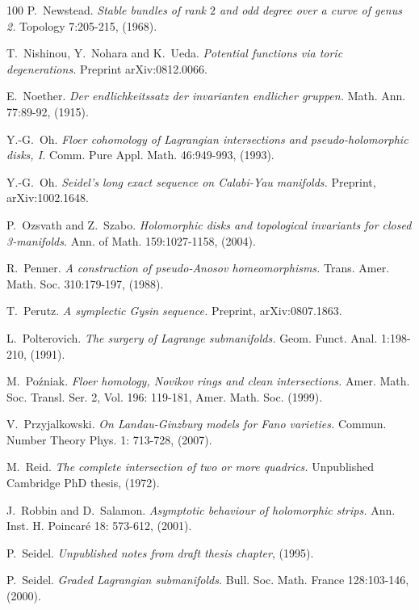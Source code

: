\documentclass[reqno,10pt]{amsart}
\numberwithin{equation}{section}
\theoremstyle{remark}
\begin{document}
\begin{thebibliography}{100}
P.~Newstead.
\emph{Stable bundles of rank $2$ and odd degree over a curve of genus 2.}
Topology 7:205-215, (1968).

T.~Nishinou, Y.~Nohara and  K.~Ueda.
\emph{Potential functions via toric degenerations.}
Preprint arXiv:0812.0066.

E.~Noether.
\emph{Der endlichkeitssatz der invarianten endlicher gruppen.}
Math. Ann. 77:89-92, (1915).



Y.-G.~Oh.
\emph{Floer cohomology of Lagrangian intersections and pseudo-holomorphic disks, I.}
Comm. Pure Appl. Math. 46:949-993, (1993).

Y.-G.~Oh.
\emph{Seidel's long exact sequence on Calabi-Yau manifolds.}
Preprint, arXiv:1002.1648.

P.~Ozsvath and Z.~Szabo.
\emph{Holomorphic disks and topological invariants for closed 3-manifolds.}
Ann. of Math. 159:1027-1158, (2004).

R.~Penner.
\emph{A construction of pseudo-Anosov homeomorphisms.}
Trans. Amer. Math. Soc. 310:179-197, (1988).

T.~Perutz.
\emph{A symplectic Gysin sequence.}
Preprint, arXiv:0807.1863.

L.~Polterovich.
\emph{The surgery of Lagrange submanifolds.}
Geom. Funct. Anal.  1:198-210, (1991).

M.~Po\'zniak.
\emph{Floer homology, Novikov rings and clean intersections.}
Amer. Math. Soc. Transl. Ser. 2, Vol. 196: 119-181, Amer. Math. Soc. (1999).


V.~Przyjalkowski.
\emph{On Landau-Ginzburg models for Fano varieties.}
Commun. Number Theory Phys. 1: 713-728, (2007).



M.~Reid.
\emph{The complete intersection of two or more quadrics.}
Unpublished Cambridge PhD thesis, (1972).


J.~Robbin and D.~Salamon.
\emph{Asymptotic behaviour of holomorphic strips.}
Ann. Inst. H. Poincar\'e 18: 573-612, (2001).


P.~Seidel.
\emph{Unpublished notes from draft thesis chapter}, (1995).

P.~Seidel.
\emph{Graded Lagrangian submanifolds.}
Bull. Soc. Math. France 128:103-146, (2000).


\end{thebibliography}
\end{document}
